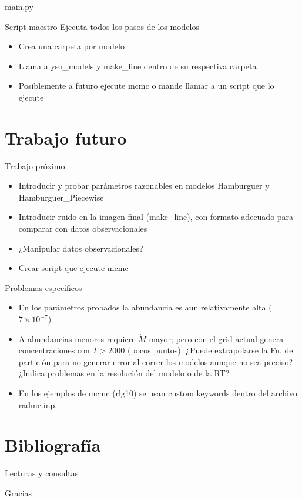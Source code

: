 \documentclass{beamer}
\begin{document}
\begin{frame}{main.py}
    \begin{block}{Script maestro}
        Ejecuta todos los pasos de los modelos
    \end{block}
    \begin{itemize}
        \item Crea una carpeta por modelo
        \item Llama a yso\_models y make\_line dentro de su respectiva carpeta
        \item Posiblemente a futuro ejecute mcmc o mande llamar a un script que lo ejecute
    \end{itemize}
\end{frame}


\section{Trabajo futuro}

\begin{frame}{Trabajo próximo}
\begin{itemize}
    \item Introducir y probar parámetros razonables en modelos Hamburguer y Hamburguer\_Piecewise
    \item Introducir ruido en la imagen final (make\_line), con formato adecuado para comparar con datos observacionales
    \item ¿Manipular datos observacionales?
    \item Crear script que ejecute mcmc
\end{itemize}
\end{frame}

\begin{frame}{Problemas específicos}
\begin{itemize}
    \item En los parámetros probados la abundancia es aun relativamente alta ($7\times 10^{-7}$)
    \item A abundancias menores requiere $\dot{M} $ mayor; pero con el grid actual genera concentraciones con $T>2000$ (pocos puntos). ¿Puede extrapolarse la Fn. de partición para no generar error al correr los modelos aunque no sea preciso? ¿Indica problemas en la resolución del modelo o de la RT?
    \item En los ejemplos de mcmc (rlg10) se usan custom keywords dentro del archivo radmc.inp. 
\end{itemize}
\end{frame}

\section{Bibliografía}
\begin{frame}[allowframebreaks]{Lecturas y consultas}
    \nocite{*}
    
\end{frame}

\begin{frame}
    \centering
    \Huge Gracias
\end{frame}
\end{document}
